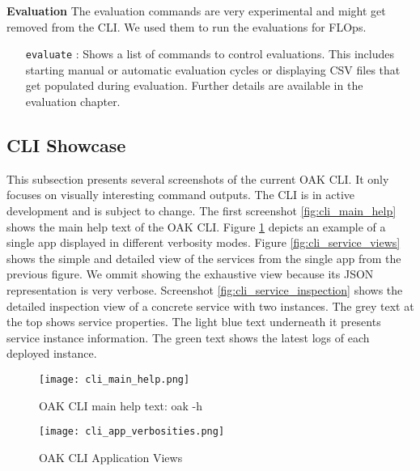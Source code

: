 \vspace{5mm}
\textbf{Evaluation}\newline
The evaluation commands are very experimental and might get removed from the CLI.
We used them to run the evaluations for FLOps.

\begin{itemize}
    \item [\texttt{evaluate}]:
        Shows a list of commands to control evaluations.
        This includes starting manual or automatic evaluation cycles or displaying CSV files that get populated during evaluation.
        Further details are available in the evaluation chapter.
\end{itemize}

\subsection{CLI Showcase}

This subsection presents several screenshots of the current OAK CLI.
It only focuses on visually interesting command outputs. 
The CLI is in active development and is subject to change.
The first screenshot \ref{fig:cli_main_help} shows the main help text of the OAK CLI.
Figure \ref{fig:cli_app_views} depicts an example of a single app displayed in different verbosity modes.
Figure \ref{fig:cli_service_views} shows the simple and detailed view of the services from the single app from the previous figure.
We ommit showing the exhaustive view because its JSON representation is very verbose.
Screenshot \ref{fig:cli_service_inspection} shows the detailed inspection view of a concrete service with two instances.
The grey text at the top shows service properties.
The light blue text underneath it presents service instance information.
The green text shows the latest logs of each deployed instance.

\begin{figure}[p]
    \begin{adjustwidth}{-0.1\paperwidth}{-0.1\paperwidth}
        \centering
        \texttt{[image: cli\_main\_help.png]}
        \caption{OAK CLI main help text: oak -h}
        \label{fig:cli_main_help}
    \end{adjustwidth}

    \begin{adjustwidth}{-0.2\paperwidth}{-0.2\paperwidth}
        \centering
        \texttt{[image: cli\_app\_verbosities.png]}
        \caption{OAK CLI Application Views}
        \label{fig:cli_app_views}
    \end{adjustwidth}
\end{figure}

